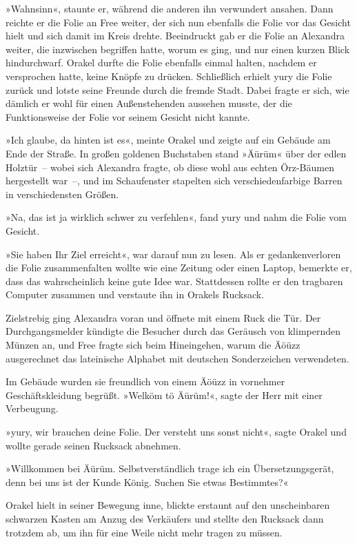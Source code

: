»Wahnsinn«, staunte er, während die anderen ihn verwundert ansahen. Dann reichte er die Folie an Free weiter, der sich nun ebenfalls die Folie vor das Gesicht hielt und sich damit im Kreis drehte. Beeindruckt gab er die Folie an Alexandra weiter, die inzwischen begriffen hatte, worum es ging, und nur einen kurzen Blick hindurchwarf. Orakel durfte die Folie ebenfalls einmal halten, nachdem er versprochen hatte, keine Knöpfe zu drücken. Schließlich erhielt yury die Folie zurück und lotste seine Freunde durch die fremde Stadt. Dabei fragte er sich, wie dämlich er wohl für einen Außenstehenden aussehen musste, der die Funktionsweise der Folie vor seinem Gesicht nicht kannte.

»Ich glaube, da hinten ist es«, meinte Orakel und zeigte auf ein Gebäude am Ende der Straße. In großen goldenen Buchstaben stand »Äürüm« über der edlen Holztür~– wobei sich Alexandra fragte, ob diese wohl aus echten Örz-Bäumen hergestellt war~–, und im Schaufenster stapelten sich verschiedenfarbige Barren in verschiedensten Größen.

»Na, das ist ja wirklich schwer zu verfehlen«, fand yury und nahm die Folie vom Gesicht.

»Sie haben Ihr Ziel erreicht«, war darauf nun zu lesen. Als er gedankenverloren die Folie zusammenfalten wollte wie eine Zeitung oder einen Laptop, bemerkte er, dass das wahrscheinlich keine gute Idee war. Stattdessen rollte er den tragbaren Computer zusammen und verstaute ihn in Orakels Rucksack.

Zielstrebig ging Alexandra voran und öffnete mit einem Ruck die Tür. Der Durchgangsmelder kündigte die Besucher durch das Geräusch von klimpernden Münzen an, und Free fragte sich beim Hineingehen, warum die Äöüzz ausgerechnet das lateinische Alphabet mit deutschen Sonderzeichen verwendeten.

Im Gebäude wurden sie freundlich von einem Äöüzz in vornehmer Geschäftskleidung begrüßt. »Welköm tö Äürüm!«, sagte der Herr mit einer Verbeugung.

»yury, wir brauchen deine Folie. Der versteht uns sonst nicht«, sagte Orakel und wollte gerade seinen Rucksack abnehmen.

»Willkommen bei Äürüm. Selbstverständlich trage ich ein Übersetzungsgerät, denn bei uns ist der Kunde König. Suchen Sie etwas Bestimmtes?«

Orakel hielt in seiner Bewegung inne, blickte erstaunt auf den unscheinbaren schwarzen Kasten am Anzug des Verkäufers und stellte den Rucksack dann trotzdem ab, um ihn für eine Weile nicht mehr tragen zu müssen.

